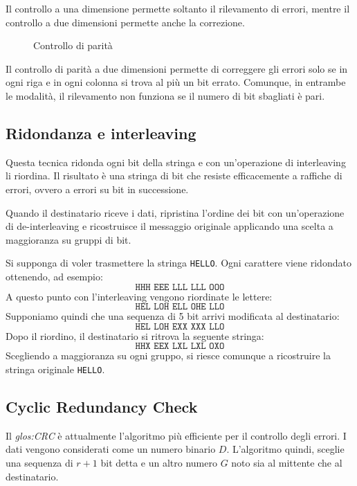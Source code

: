 Il controllo a una dimensione permette soltanto il rilevamento di errori, mentre il
controllo a due dimensioni permette anche la correzione.

\begin{figure}[h!]
    \centering
    \caption{Controllo di parità}
\end{figure}\noindent
Il controllo di parità a due dimensioni permette di correggere gli errori solo se
in ogni riga e in ogni colonna si trova al più un bit errato. Comunque, in entrambe le
modalità, il rilevamento non funziona se il numero di bit sbagliati è pari.

\subsection{Ridondanza e interleaving}
Questa tecnica ridonda ogni bit della stringa e con un'operazione di interleaving
li riordina. Il risultato è una stringa di bit che resiste efficacemente a
raffiche di errori, ovvero a errori su bit in successione.

Quando il destinatario riceve i dati, ripristina l'ordine dei bit con un'operazione
di de-interleaving e ricostruisce il messaggio originale applicando una scelta a
maggioranza su gruppi di bit.

\begin{eg}
    Si supponga di voler trasmettere la stringa \texttt{HELLO}. Ogni carattere viene
    ridondato ottenendo, ad esempio:
    \[\texttt{HHH EEE LLL LLL OOO}\]
    A questo punto con l'interleaving vengono riordinate le lettere:
    \[\texttt{HEL LOH ELL OHE LLO}\]
    Supponiamo quindi che una sequenza di 5 bit arrivi modificata al destinatario:
    \[\texttt{HEL LOH EXX XXX LLO}\]
    Dopo il riordino, il destinatario si ritrova la seguente stringa:
    \[\texttt{HHX EEX LXL LXL OXO}\]
    Scegliendo a maggioranza su ogni gruppo, si riesce comunque a ricostruire la stringa
    originale \texttt{HELLO}.
\end{eg}

\subsection{Cyclic Redundancy Check}
Il \emph{\gls{glos:CRC}} è attualmente l'algoritmo più efficiente per il controllo degli
errori. I dati vengono considerati come un numero binario $D$. L'algoritmo quindi, sceglie
una sequenza di $r+1$ bit detta \emph{} e un altro numero $G$ noto sia
al mittente che al destinatario.

